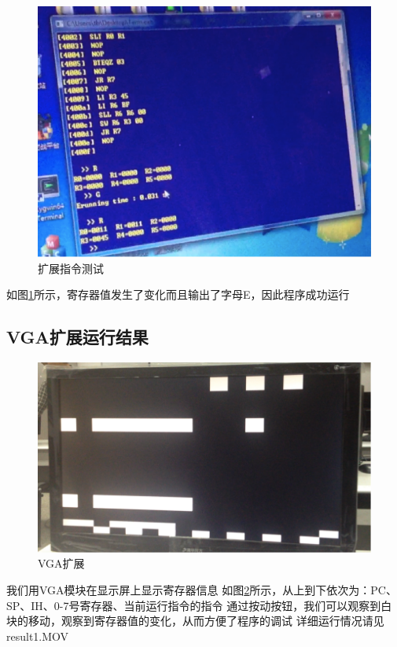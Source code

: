 \documentclass{article}
\begin{document}
\begin{figure}[h]
\centering
\includegraphics[width=1.1\columnwidth]{test.png}
\caption{扩展指令测试}
\label{fig:test}
\end{figure}

如图\ref{fig:test}所示，寄存器值发生了变化而且输出了字母E，因此程序成功运行

\subsection{VGA扩展运行结果}
\begin{figure}[h]
\centering
\includegraphics[width=1.1\columnwidth]{vga.png}
\caption{VGA扩展}
\label{fig:vga}
\end{figure}

我们用VGA模块在显示屏上显示寄存器信息
如图\ref{fig:vga}所示，从上到下依次为：PC、SP、IH、0-7号寄存器、当前运行指令的指令
通过按动按钮，我们可以观察到白块的移动，观察到寄存器值的变化，从而方便了程序的调试
详细运行情况请见result1.MOV
\end{document}
